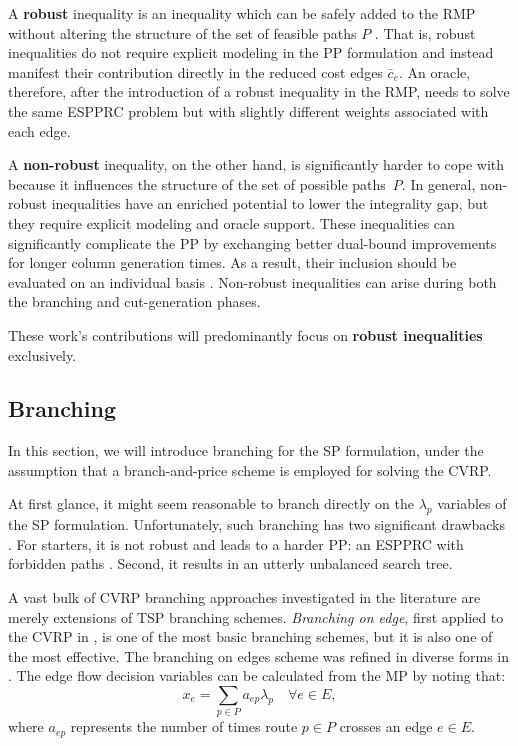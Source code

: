 A \textbf{robust} inequality is an inequality
which can be safely added to the RMP
without altering the structure of the set of feasible paths $P$ \parencite{fukasawa2006}.
That is,
robust inequalities do not require explicit modeling in the PP formulation
and instead manifest their contribution directly in the reduced cost edges $\bar{c}_e$.
An oracle, therefore,
after the introduction of a robust inequality in the RMP,
needs to solve the same ESPPRC problem
but with slightly different weights associated with each edge.

A \textbf{non-robust} inequality, on the other hand,
is significantly harder to cope with
because it influences the structure of the set of possible paths $P$.
In general,
non-robust inequalities have an enriched potential to lower the integrality gap,
but they require explicit modeling and oracle support.
These inequalities can significantly complicate the PP
by exchanging better dual-bound improvements for longer column generation times.
As a result, their inclusion should be evaluated on an individual basis \parencite{desaulniers2011}.
Non-robust inequalities can arise during both the branching and cut-generation phases.

These work's contributions will predominantly focus
on \textbf{robust inequalities} exclusively.

\subsection{Branching}
\label{sec:bap-branching}

In this section, we will introduce branching for the SP formulation,
under the assumption that a branch-and-price scheme is employed
for solving the CVRP.

At first glance,
it might seem reasonable to branch directly on the $\lambda_p$ variables of the SP formulation.
Unfortunately, such branching has two significant drawbacks \parencite{vanderbeck2010reformulation}.
For starters,
it is not robust and leads to a harder PP: an ESPPRC with forbidden paths \parencite{villeneuve2005}.
Second, it results in an utterly unbalanced search tree.

A vast bulk of CVRP branching approaches investigated in the literature are
merely extensions of TSP branching schemes.
\textit{Branching on edge},
first applied to the CVRP in \textcite{christofides1969},
is one of the most basic branching schemes, but it is also one of the most effective.
The branching on edges scheme was refined in diverse forms in \textcite{fisher1994, miller1995}.
The edge flow decision variables can be calculated from the MP by noting that:
\begin{equation}
	x_e = \sum_{p \in P} a_{ep} \lambda_p  \quad \forall e \in E,
\end{equation}
where $a_{ep}$ represents the number of times route $p \in P$ crosses an edge $e \in E$.

